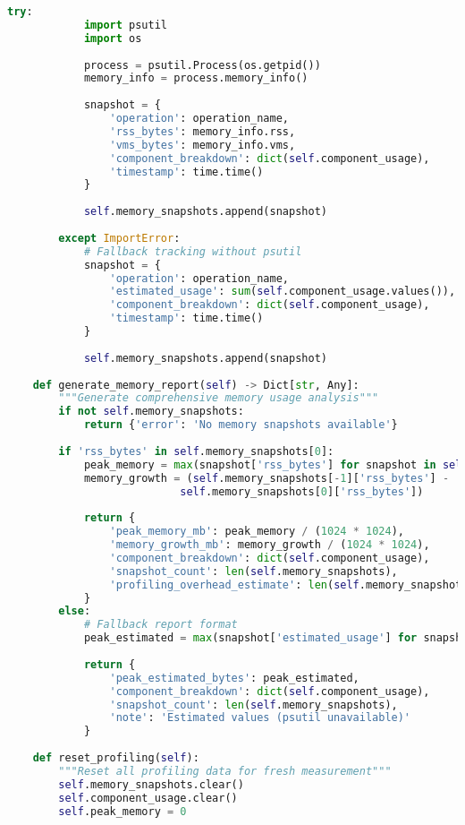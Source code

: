 \begin{lstlisting}[language=Python, caption=Memory Management and Profiling System]
        try:
            import psutil
            import os
            
            process = psutil.Process(os.getpid())
            memory_info = process.memory_info()
            
            snapshot = {
                'operation': operation_name,
                'rss_bytes': memory_info.rss,
                'vms_bytes': memory_info.vms,
                'component_breakdown': dict(self.component_usage),
                'timestamp': time.time()
            }
            
            self.memory_snapshots.append(snapshot)
            
        except ImportError:
            # Fallback tracking without psutil
            snapshot = {
                'operation': operation_name,
                'estimated_usage': sum(self.component_usage.values()),
                'component_breakdown': dict(self.component_usage),
                'timestamp': time.time()
            }
            
            self.memory_snapshots.append(snapshot)
    
    def generate_memory_report(self) -> Dict[str, Any]:
        """Generate comprehensive memory usage analysis"""
        if not self.memory_snapshots:
            return {'error': 'No memory snapshots available'}
        
        if 'rss_bytes' in self.memory_snapshots[0]:
            peak_memory = max(snapshot['rss_bytes'] for snapshot in self.memory_snapshots)
            memory_growth = (self.memory_snapshots[-1]['rss_bytes'] - 
                           self.memory_snapshots[0]['rss_bytes'])
            
            return {
                'peak_memory_mb': peak_memory / (1024 * 1024),
                'memory_growth_mb': memory_growth / (1024 * 1024),
                'component_breakdown': dict(self.component_usage),
                'snapshot_count': len(self.memory_snapshots),
                'profiling_overhead_estimate': len(self.memory_snapshots) * 0.1  # MB
            }
        else:
            # Fallback report format
            peak_estimated = max(snapshot['estimated_usage'] for snapshot in self.memory_snapshots)
            
            return {
                'peak_estimated_bytes': peak_estimated,
                'component_breakdown': dict(self.component_usage),
                'snapshot_count': len(self.memory_snapshots),
                'note': 'Estimated values (psutil unavailable)'
            }
    
    def reset_profiling(self):
        """Reset all profiling data for fresh measurement"""
        self.memory_snapshots.clear()
        self.component_usage.clear()
        self.peak_memory = 0
\end{lstlisting}

